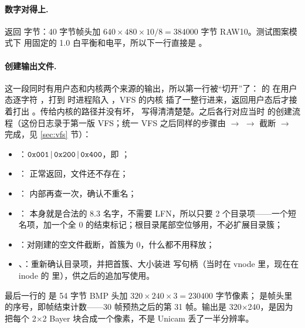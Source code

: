 \paragraph{ 数字对得上.}  返回  字节：40 字节帧头加 $640\times480\times10/8=384000$ 字节 RAW10。测试图案模式下  用固定的 1.0 白平衡和电平，所以下一行直接是 。

\paragraph{ 创建输出文件.} 这一段同时有用户态和内核两个来源的输出，所以第一行被“切开”了： 的  在用户态逐字符 ，打到  时进程陷入 ，VFS 的内核  插了一整行进来，返回用户态后才接着打出 。传给内核的路径并没有坏， 写得清清楚楚。之后各行对应当时  的创建流程（这份日志录于第一版 VFS；统一 VFS 之后同样的步骤由  $\to$  $\to$  截断 $\to$  完成，见 \ref{sec:vfs} 节）：

\begin{itemize}
  \item {}：$\code{0x001}\,|\,\code{0x200}\,|\,\code{0x400}$，即 ；
  \item {}： 正常返回，文件还不存在；
  \item {}： 内部再查一次，确认不重名；
  \item {}： 本身就是合法的 8.3 名字，不需要 LFN，所以只要 2 个目录项——一个短名项，加一个全 0 的结束标记；根目录尾部空位够用，不必扩展目录簇；
  \item {}：对刚建的空文件截断，首簇为 0，什么都不用释放；
  \item {}、：重新确认目录项，并把首簇、大小装进  写句柄（当时在 vnode 里，现在在 inode 的  里），供之后的追加写使用。
\end{itemize}

最后一行的  是 54 字节 BMP 头加 $320\times240\times3=230400$ 字节像素； 是帧头里的序号，即帧结束计数——30 帧预热之后的第 31 帧。输出是 320$\times$240，是因为  把每个 2$\times$2 Bayer 块合成一个像素，不是 Unicam 丢了一半分辨率。

